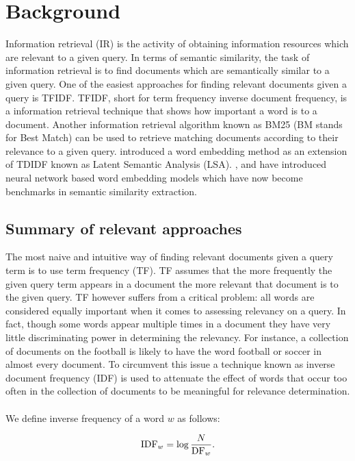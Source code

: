 \chapter{Background} 
\label{chapter:background}
Information retrieval (IR) is the activity of obtaining information resources which are relevant to a given query. In terms of semantic similarity, the task of information retrieval is to find documents which are semantically similar to a given query. One of the easiest approaches for finding relevant documents given a query is TFIDF.
TFIDF, short for term frequency inverse document frequency, is a information retrieval technique that shows how important a word is to a document. Another information retrieval algorithm known as BM25 (BM stands for Best Match) \cite{robertson2009probabilistic} can be used to retrieve matching documents according to their relevance to a given query. \cite{dumais2004latent} introduced a word embedding method as an extension of TDIDF known as Latent Semantic Analysis (LSA). \cite{mikolov2013efficient}, \cite{pennington2014glove} and \cite{shazeer2016swivel} have introduced neural network based word embedding models which have now become benchmarks in semantic similarity extraction.


\section{Summary of relevant approaches}
The most naive and intuitive way of finding relevant documents given a query term is to use term frequency (TF). TF assumes that the more frequently the given query term appears in a document the more relevant that document is to the given query. TF however suffers from a critical problem: all words are considered equally important when it comes to assessing relevancy on a query. In fact, though some words appear multiple times in a document they have very little discriminating power  in determining the relevancy. For instance, a collection of documents on the football is likely to have the word football or soccer in almost every document. To circumvent this issue a technique known as inverse document frequency (IDF) is used to  attenuate the effect of words that occur too often in the collection of documents to be meaningful for relevance determination.
\\
\\
We define inverse frequency of a word $w$ as follows:

\begin{displaymath}
\mbox{IDF}_w = \log {N\over \mbox{DF}_w}.
\end{displaymath}

